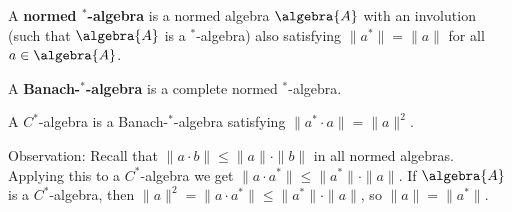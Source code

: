 \documentclass[a4paper]{article}
\begin{document}
\begin{definition}
	A \textbf{normed $^*$-algebra} is a normed algebra $\algebra{A}$ with an involution (such that $\algebra{A}$ is a $^*$-algebra) also satisfying $\| a^*\| = \|a\|$ for all $a \in \algebra{A}$.

	A \textbf{Banach-$^*$-algebra} is a complete normed $^*$-algebra.
\end{definition}

\begin{definition}
	A $C^*$-algebra is a Banach-$^*$-algebra satisfying $\|a^* \cdot a\| = \| a \|^2$.
\end{definition}

Observation: Recall that $\|a \cdot b\| \leq \|a\| \cdot \| b \|$ in all normed algebras. Applying this to a $C^*$-algebra we get $\|a \cdot a^*\| \leq \|a^*\| \cdot \| a \|$. If $\algebra{A}$ is a $C^*$-algebra, then $\| a \| ^2 = \| a \cdot a^*\| \leq \|a^*\| \cdot \|a\|$, so $\| a\| = \|a^*\|$.
\end{document}
